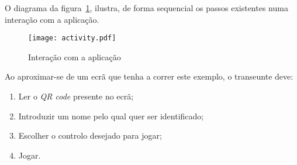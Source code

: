	O diagrama da figura~\ref{fig:interagir}, ilustra, de forma sequencial os passos existentes numa interação com a aplicação.
	\newline

	\begin{figure}[ht]
	\centering
	\texttt{[image: activity.pdf]}
	\caption[Utilização]{Interação com a aplicação}
	\label{fig:interagir}
	\end{figure}

\pagebreak

	Ao aproximar-se de um ecrã que tenha a correr este exemplo, o transeunte deve:

	\begin{enumerate}
		\item Ler o \textit{QR code} presente no ecrã;
		\item Introduzir um nome pelo qual quer ser identificado;
		\item Escolher o controlo desejado para jogar;
		\item Jogar.
	\end{enumerate}


	


	





